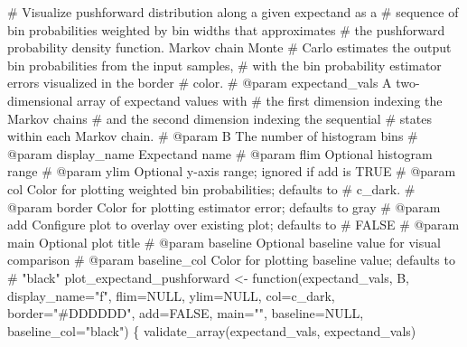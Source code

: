 \documentclass[
  letterpaper,
  DIV=11,
  numbers=noendperiod]{scrartcl}
\newenvironment{Shaded}{\begin{snugshade}}{\end{snugshade}}
\newcommand{\CommentTok}[1]{\textcolor[rgb]{0.37,0.37,0.37}{#1}}
\newcommand{\NormalTok}[1]{\textcolor[rgb]{0.00,0.23,0.31}{#1}}
\newcommand{\OperatorTok}[1]{\textcolor[rgb]{0.37,0.37,0.37}{#1}}
\newcommand{\StringTok}[1]{\textcolor[rgb]{0.13,0.47,0.30}{#1}}
\begin{document}
\begin{Shaded}
\begin{Highlighting}[]
\CommentTok{\# Visualize pushforward distribution along a given expectand as a}
\CommentTok{\# sequence of bin probabilities weighted by bin widths that approximates}
\CommentTok{\# the pushforward probability density function.  Markov chain Monte}
\CommentTok{\# Carlo estimates the output bin probabilities from the input samples,}
\CommentTok{\# with the bin probability estimator errors visualized in the border}
\CommentTok{\# color.}
\CommentTok{\# @param expectand\_vals A two{-}dimensional array of expectand values with}
\CommentTok{\#                       the first dimension indexing the Markov chains}
\CommentTok{\#                       and the second dimension indexing the sequential}
\CommentTok{\#                       states within each Markov chain.}
\CommentTok{\# @param B The number of histogram bins}
\CommentTok{\# @param display\_name Expectand name}
\CommentTok{\# @param flim Optional histogram range}
\CommentTok{\# @param ylim Optional y{-}axis range; ignored if add is TRUE}
\CommentTok{\# @param col Color for plotting weighted bin probabilities; defaults to}
\CommentTok{\#            c\_dark.}
\CommentTok{\# @param border Color for plotting estimator error; defaults to gray}
\CommentTok{\# @param add Configure plot to overlay over existing plot; defaults to}
\CommentTok{\#            FALSE}
\CommentTok{\# @param main Optional plot title}
\CommentTok{\# @param baseline Optional baseline value for visual comparison}
\CommentTok{\# @param baseline\_col Color for plotting baseline value; defaults to}
\CommentTok{\#                     "black"}
\NormalTok{plot\_expectand\_pushforward }\OperatorTok{\textless{}{-}}\NormalTok{ function(expectand\_vals, B,}
\NormalTok{                                       display\_name}\OperatorTok{=}\StringTok{"f"}\NormalTok{,}
\NormalTok{                                       flim}\OperatorTok{=}\NormalTok{NULL, ylim}\OperatorTok{=}\NormalTok{NULL,}
\NormalTok{                                       col}\OperatorTok{=}\NormalTok{c\_dark, border}\OperatorTok{=}\StringTok{"\#DDDDDD"}\NormalTok{,}
\NormalTok{                                       add}\OperatorTok{=}\NormalTok{FALSE, main}\OperatorTok{=}\StringTok{""}\NormalTok{,}
\NormalTok{                                       baseline}\OperatorTok{=}\NormalTok{NULL,}
\NormalTok{                                       baseline\_col}\OperatorTok{=}\StringTok{"black"}\NormalTok{) \{}
\NormalTok{  validate\_array(expectand\_vals, }\StringTok{\textquotesingle{}expectand\_vals\textquotesingle{}}\NormalTok{)}


\end{Highlighting}
\end{Shaded}
\end{document}
